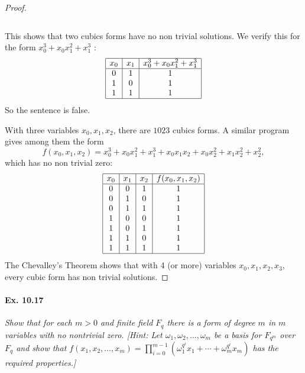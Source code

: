 \documentclass[11pt,a4paper]{article}
\begin{document}
\begin{proof}
\begin{verbatim}
\end{verbatim}

This shows that two cubics forms have no non trivial solutions. We verify this for the form $x_0^3 + x_0x_1^2 + x_1^3$ :
$$
\begin{array}{|c|c|c|}
\hline
x_0 & x_1 & x_0^3 + x_0x_1^2 + x_1^3\\
\hline
0 & 1 & 1\\
1 & 0 & 1\\
1 & 1 & 1\\
\hline
\end{array}
$$
So the sentence is false.

With three variables $x_0,x_1,x_2$, there are $1023$ cubics forms. A similar program gives among them the form
$$f(x_0,x_1,x_2) = x_0^3 + x_0x_1^2 + x_1^3 + x_0x_1x_2 + x_0x_2^2 + x_1x_2^2 + x_2^2,$$
which has no non trivial zero:
$$
\begin{array}{|c|c|c|c|}
\hline
x_0 & x_1 & x_2 &f(x_0,x_1,x_2)\\
\hline
0 & 0 & 1& 1\\
0 & 1 &0 &1\\
0 & 1 & 1& 1\\
1 & 0 & 0 & 1\\
1 & 0 & 1 & 1\\
1 & 1 & 0 & 1\\
1 & 1 & 1 & 1\\
\hline
\end{array}
$$
The Chevalley's Theorem shows that with 4 (or more) variables $x_0,x_1,x_2, x_3$, every cubic form has non trivial solutions.
\end{proof}


\paragraph{Ex. 10.17} {\it Show that for each $m>0$ and finite field $F_q$ there is a form of degree $m$ in $m$ variables with no nontrivial zero. [Hint: Let $\omega_1,\omega_2,\ldots,\omega_m$ be a basis for $F_{q^m}$ over $F_q$ and show that $f(x_1,x_2,\ldots,x_m) = \prod_{i=0}^{m-1} (\omega_1^{q^i} x_1 + \cdots + \omega_m^{q^i} x_m)$ has the required properties.]
}
\end{document}
